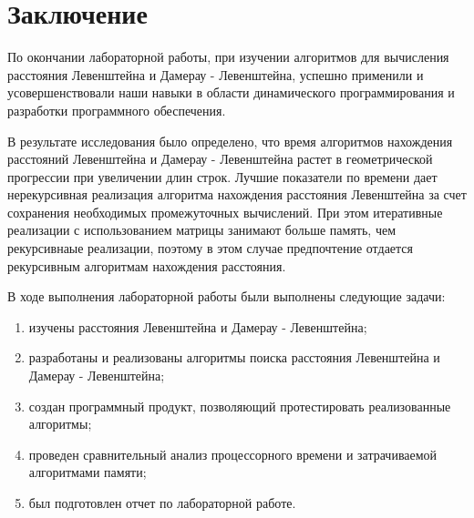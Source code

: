 \chapter*{Заключение}

По окончании лабораторной работы, при изучении алгоритмов для вычисления расстояния Левенштейна и Дамерау - Левенштейна, успешно применили и усовершенствовали наши навыки в области динамического программирования и разработки программного обеспечения.

В результате исследования было определено, что время алгоритмов нахождения расстояний Левенштейна и Дамерау - Левенштейна растет в геометрической прогрессии при увеличении длин строк. 
Лучшие показатели по времени дает нерекурсивная реализация алгоритма нахождения расстояния Левенштейна за счет сохранения необходимых промежуточных вычислений. 
При этом итеративные реализации с использованием матрицы занимают больше память, чем рекурсивнаые реализации, поэтому в этом случае предпочтение отдается рекурсивным алгоритмам нахождения расстояния. 

В ходе выполнения лабораторной работы были выполнены следующие задачи: 
\begin{enumerate}[label={\arabic*)}]
	\item изучены расстояния Левенштейна и Дамерау - Левенштейна;
	\item разработаны и реализованы алгоритмы поиска расстояния Левенштейна и Дамерау - Левенштейна;
	\item создан программный продукт, позволяющий протестировать реализованные алгоритмы;
	\item проведен сравнительный анализ процессорного времени и затрачиваемой алгоритмами памяти;
	\item был подготовлен отчет по лабораторной работе.
\end{enumerate}